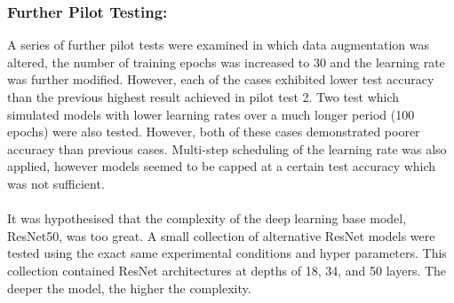 \subsubsection{Further Pilot Testing:}
A series of further pilot tests were examined in which data augmentation was altered, the number of training epochs was increased to 30 and the learning rate was further modified. However, each of the cases exhibited lower test accuracy than the previous highest result achieved in pilot test 2. Two test which simulated models with lower learning rates over a much longer period (100 epochs) were also tested. However, both of these cases demonstrated poorer accuracy than previous cases. Multi-step scheduling of the learning rate was also applied, however models seemed to be capped at a certain test accuracy which was not sufficient. \\ \\
It was hypothesised that the complexity of the deep learning base model, ResNet50, was too great. A small collection of alternative ResNet models were tested using the exact same experimental conditions and hyper parameters. This collection contained ResNet architectures at depths of 18, 34, and 50 layers. The deeper the model, the higher the complexity. 

